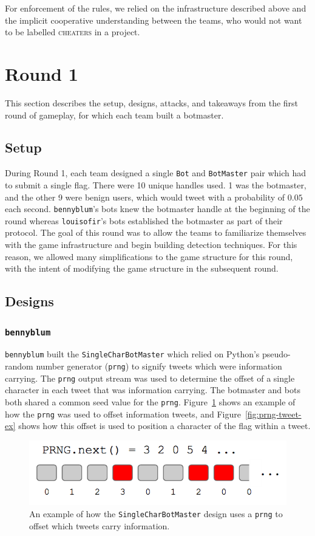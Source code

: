 \documentclass[11pt, oneside]{article} %
\numberwithin{equation}{section} %
\numberwithin{figure}{section} %
\numberwithin{table}{section} %
\renewcommand{\c}[1]{\texttt{#1}}
\newcommand{\teambb}{\c{bennyblum}}
\newcommand{\teamol}{\c{louisofir}}
\begin{document}
		For enforcement of the rules, we relied on the infrastructure described above and the implicit cooperative understanding between the teams, who would not want to be labelled \textsc{cheaters} in a project.

\section{Round 1}
	This section describes the setup, designs, attacks, and takeaways from the first round of gameplay, for which each team built a botmaster.

	\subsection{Setup}
		During Round 1, each team designed a single \c{Bot} and \c{BotMaster} pair which had to submit a single flag. There were 10 unique handles used. 1 was the botmaster, and the other 9 were benign users, which would tweet with a probability of $0.05$ each second. \teambb{}'s bots knew the botmaster handle at the beginning of the round whereas \teamol{}'s bots established the botmaster as part of their protocol. The goal of this round was to allow the teams to familiarize themselves with the game infrastructure and begin building detection techniques. For this reason, we allowed many simplifications to the game structure for this round, with the intent of modifying the game structure in the subsequent round. 

	\subsection{Designs}
	
		\subsubsection{\teambb{}}
			\teambb{} built the \c{SingleCharBotMaster} which relied on Python's pseudo-random number generator (\c{prng}) to signify tweets which were information carrying. The \c{prng} output stream was used to determine the offset of a single character in each tweet that was information carrying. The botmaster and bots both shared a common seed value for the \c{prng}. Figure~\ref{fig:prng} shows an example of how the \c{prng} was used to offset information tweets, and Figure~\ref{fig:prng-tweet-ex} shows how this offset is used to position a character of the flag within a tweet.

		\begin{figure}[H]
		    \center\includegraphics[scale=0.70]{resources/prng.png}
		    \caption{An example of how the \c{SingleCharBotMaster} design uses a \c{prng} to offset which tweets carry information.}
		    \label{fig:prng}
		 \end{figure}
\end{document}
